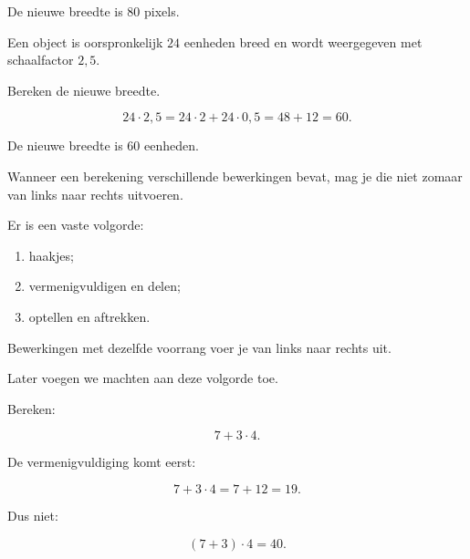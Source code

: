 \documentclass{ximera}
\begin{document}
\begin{oefening}[Schaalfactoren]{\oefU}
\begin{question}
\begin{oplossing}
De nieuwe breedte is \(80\) pixels.

\end{oplossing}

\end{question}


\begin{question}

Een object is oorspronkelijk \(24\) eenheden breed en wordt weergegeven met
schaalfactor \(2{,}5\).

Bereken de nieuwe breedte.

\begin{oplossing}

\[
24\cdot2{,}5
=
24\cdot2+24\cdot0{,}5
=
48+12
=
60.
\]

De nieuwe breedte is \(60\) eenheden.

\end{oplossing}

\end{question}

\end{oefening}



Wanneer een berekening verschillende bewerkingen bevat, mag je die niet
zomaar van links naar rechts uitvoeren.

Er is een vaste volgorde:

\begin{enumerate}
    \item haakjes;
    \item vermenigvuldigen en delen;
    \item optellen en aftrekken.
\end{enumerate}

Bewerkingen met dezelfde voorrang voer je van links naar rechts uit.

Later voegen we machten aan deze volgorde toe.


\begin{voorbeeld}

Bereken:

\[
7+3\cdot4.
\]

De vermenigvuldiging komt eerst:

\[
7+3\cdot4
=
7+12
=
19.
\]

Dus niet:

\[
(7+3)\cdot4=40.
\]

\end{voorbeeld}
\end{document}
